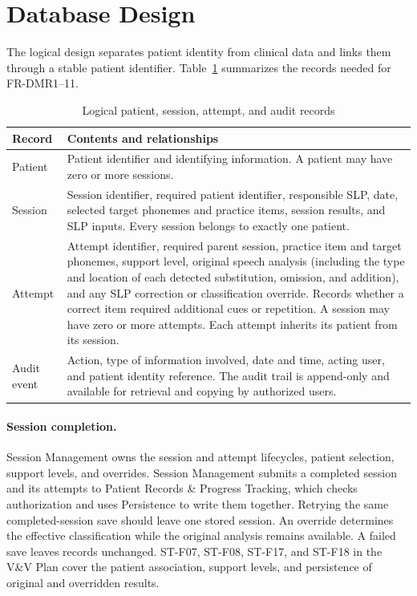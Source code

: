 \documentclass[12pt, titlepage]{article}
\begin{document}
\section{Database Design} \label{SecDatabase}

The logical design separates patient identity from clinical data and links
them through a stable patient identifier. Table~\ref{TblDatabaseRecords}
summarizes the records needed for FR-DMR1--11.

\begin{table}[H]
\centering
\begin{tabularx}{\textwidth}{@{}l X@{}}
\toprule
\textbf{Record} & \textbf{Contents and relationships}\\
\midrule
Patient & Patient identifier and identifying information. A patient may have
zero or more sessions.\\
Session & Session identifier, required patient identifier, responsible SLP,
date, selected target phonemes and practice items, session results, and SLP
inputs. Every session belongs to exactly one patient.\\
Attempt & Attempt identifier, required parent session, practice item and
target phonemes, support level, original speech analysis (including the type
and location of each detected substitution, omission, and addition), and any
SLP correction or classification override. Records whether a correct item
required additional cues or repetition. A session may have zero or more
attempts. Each attempt inherits its patient from its session.\\
Audit event & Action, type of information involved, date and time, acting
user, and patient identity reference. The audit trail is append-only and
available for retrieval and copying by authorized users.\\
\bottomrule
\end{tabularx}
\caption{Logical patient, session, attempt, and audit records}
\label{TblDatabaseRecords}
\end{table}

\paragraph{Session completion.}
Session Management owns the session and attempt lifecycles, patient
selection, support levels, and overrides. Session Management submits a
completed session and its attempts to Patient Records
\& Progress Tracking, which checks authorization and uses Persistence to
write them together.
Retrying the same completed-session save should leave one stored session.
An override determines the effective classification while the original
analysis remains available. A failed save leaves records unchanged.
ST-F07, ST-F08, ST-F17, and ST-F18 in the
V\&V Plan cover the patient association, support levels, and persistence of
original and overridden results.
\end{document}
